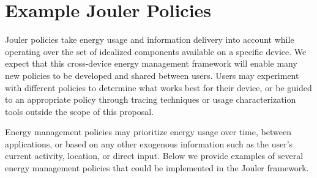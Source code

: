 \section{Example Jouler Policies}

Jouler policies take energy usage and information delivery into account while
operating over the set of idealized components available on a specific
device. We expect that this cross-device energy management framework will
enable many new policies to be developed and shared between users. Users may
experiment with different policies to determine what works best for their
device, or be guided to an appropriate policy through tracing techniques or
usage characterization tools outside the scope of this proposal.

Energy management policies may prioritize energy usage over time, between
applications, or based on any other exogenous information such as the user's
current activity, location, or direct input. Below we provide examples of
several energy management policies that could be implemented in the Jouler
framework.

